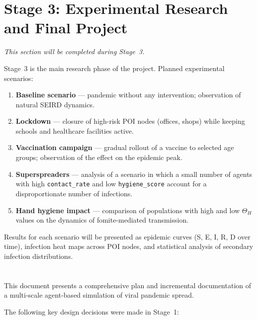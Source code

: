 \documentclass[english]{projectreport}
\begin{document}
\section{Stage 3: Experimental Research and Final Project}
\label{sec:stage3}

\emph{This section will be completed during Stage~3.}

Stage~3 is the main research phase of the project. Planned experimental
scenarios:

\begin{enumerate}
  \item \textbf{Baseline scenario} --- pandemic without any intervention;
        observation of natural SEIRD dynamics.
  \item \textbf{Lockdown} --- closure of high-risk POI nodes (offices, shops)
        while keeping schools and healthcare facilities active.
  \item \textbf{Vaccination campaign} --- gradual rollout of a vaccine to
        selected age groups; observation of the effect on the epidemic peak.
  \item \textbf{Superspreaders} --- analysis of a scenario in which a small
        number of agents with high \texttt{contact\_rate} and low
        \texttt{hygiene\_score} account for a disproportionate number of
        infections.
  \item \textbf{Hand hygiene impact} --- comparison of populations with high
        and low $\Theta_H$ values on the dynamics of fomite-mediated
        transmission.
\end{enumerate}

Results for each scenario will be presented as epidemic curves (S, E, I, R, D
over time), infection heat maps across POI nodes, and statistical analysis of
secondary infection distributions.

\section{\SectionTitleSummary}
\label{sec:conclusions}

This document presents a comprehensive plan and incremental documentation of a
multi-scale agent-based simulation of viral pandemic spread.

The following key design decisions were made in Stage~1:
\end{document}
